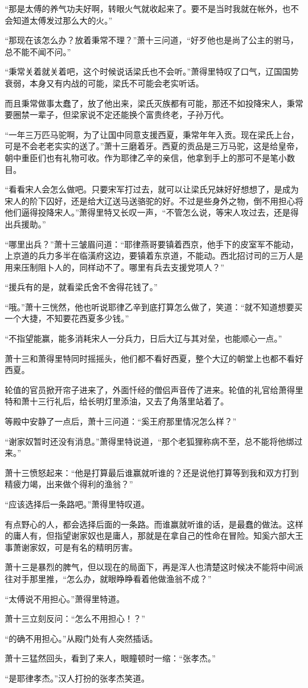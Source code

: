 “那是太傅的养气功夫好啊，转眼火气就收起来了。要不是当时我就在帐外，也不会知道太傅发过那么大的火。”

“那现在该怎么办？放着秉常不理？”萧十三问道，“好歹他也是尚了公主的驸马，总不能不闻不问。”

“秉常关着就关着吧，这个时候说话梁氏也不会听。”萧得里特叹了口气，辽国国势衰弱，本身又有内战的可能，梁氏不可能会老实听话。

而且秉常做事太蠢了，放了他出来，梁氏灭族都有可能，那还不如投降宋人，秉常要圈禁一辈子，但梁家说不定还能换个富贵终老，子孙万代。

“一年三万匹马驼啊，为了让国中同意支援西夏，秉常年年入贡。现在梁氏上台，可是不会老老实实的送了。”萧十三磨着牙。西夏的贡品是三万马驼，这是给皇帝，朝中重臣们也有礼物可收。作为耶律乙辛的亲信，他拿到手上的那可不是笔小数目。

“看看宋人会怎么做吧。只要宋军打过去，就可以让梁氏兄妹好好想想了，是成为宋人的阶下囚好，还是给大辽送马送骆驼的好。不过是些身外之物，倒不用担心将他们逼得投降宋人。”萧得里特又长叹一声，“不管怎么说，等宋人攻过去，还是得出兵援助。”

“哪里出兵？”萧十三皱眉问道：“耶律燕哥要镇着西京，他手下的皮室军不能动，上京道的兵力多半在临潢府这边，要镇着东京道，不能动。西北招讨司的三万人是用来压制阻卜人的，同样动不了。哪里有兵去支援党项人？”

“援兵有的是，就看梁氏舍不舍得花钱了。”

“哦。”萧十三恍然，他也听说耶律乙辛到底打算怎么做了，笑道：“就不知道想要买一个大捷，不知要花西夏多少钱。”

“不指望能赢，能多消耗宋人一分兵力，日后大辽与其对垒，也能顺心一点。”

萧十三和萧得里特同时摇摇头，他们都不看好西夏，整个大辽的朝堂上也都不看好西夏。

轮值的官员掀开帘子进来了，外面忏经的僧侣声音传了进来。轮值的礼官给萧得里特和萧十三行礼后，给长明灯里添油，又去了角落里站着了。

等殿中安静了一点后，萧十三问道：“奚王府那里情况怎么样？”

“谢家奴暂时还没有消息。”萧得里特说道，“那个老狐狸称病不至，总不能将他绑过来。”

萧十三愤怒起来：“他是打算最后谁赢就听谁的？还是说他打算等到我和双方打到精疲力竭，出来做个得利的渔翁？”

“应该选择后一条路吧。”萧得里特叹道。

有点野心的人，都会选择后面的一条路。而谁赢就听谁的话，是最蠢的做法。这样的庸人有，但指望谢家奴也是庸人，那就是在拿自己的性命在冒险。知奚六部大王事萧谢家奴，可是有名的精明厉害。

萧十三是暴烈的脾气，但以现在的局面下，再是浑人也清楚这时候决不能将中间派往对手那里推，“怎么办，就眼睁睁看着他做渔翁不成？”

“太傅说不用担心。”萧得里特道。

萧十三立刻反问：“怎么不用担心！？”

“的确不用担心。”从殿门处有人突然插话。

萧十三猛然回头，看到了来人，眼瞳顿时一缩：“张孝杰。”

“是耶律孝杰。”汉人打扮的张孝杰笑道。

